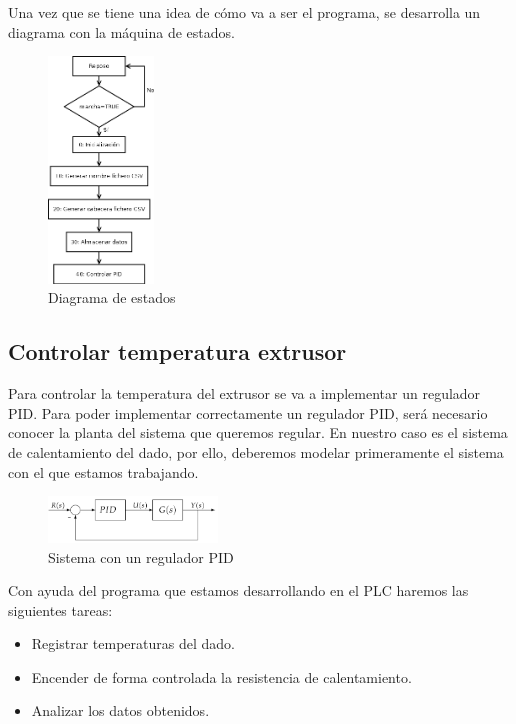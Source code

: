 Una vez que se tiene una idea de cómo va a ser el programa, se desarrolla un diagrama con la máquina de estados.

    \begin{figure}[H]
            \centering
            \includegraphics[width=0.25\textwidth]{images/PLC/diagrama.png}
            \caption{Diagrama de estados}
            \label{fig:plc_estados}
    \end{figure}

\subsection{Controlar temperatura extrusor}
\label{sec:plc_PID}

Para controlar la temperatura del extrusor se va a implementar un regulador PID. Para poder implementar correctamente un regulador PID, será necesario conocer la planta del sistema que queremos regular. En nuestro caso es el sistema de calentamiento del dado, por ello, deberemos modelar primeramente el sistema con el que estamos trabajando.
    \begin{figure}[H]
            \centering
            \includegraphics[width=0.4\textwidth]{images/PLC/sistema.png}
            \caption{Sistema con un regulador PID}
            \label{fig:plc_sistema}
    \end{figure}

Con ayuda del programa que estamos desarrollando en el PLC haremos las siguientes tareas:

\begin{itemize}
	\item{Registrar temperaturas del dado.}
	\item{Encender de forma controlada la resistencia de calentamiento.}
	\item{Analizar los datos obtenidos.}
\end{itemize}

